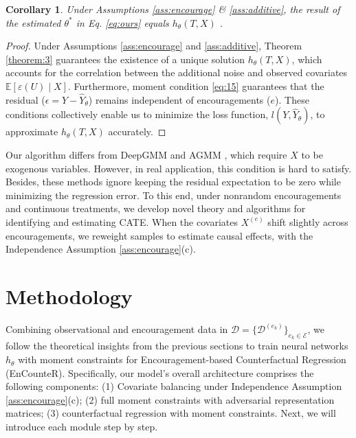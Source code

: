 \documentclass[journal]{IEEEtran}
\newtheorem{corollary}{Corollary}
\begin{document}
\begin{corollary} \label{corollary:1}
    Under Assumptions \ref{ass:encourage} \& \ref{ass:additive}, the result of the estimated $\theta^\ast$ in Eq. \eqref{eq:ours} equals ${ h  }_{\theta}(T,X)$ .
\end{corollary}

\begin{proof}
    Under Assumptions \ref{ass:encourage} and \ref{ass:additive}, Theorem \ref{theorem:3} guarantees the existence of a unique solution $h_{\theta}(T, X)$, which accounts for the correlation between the additional noise and observed covariates $\mathbb{E}[\varepsilon(U) \mid X]$. Furthermore, moment condition \eqref{eq:15} guarantees that the residual ($\epsilon = Y - \hat{Y}_\theta$) remains independent of encouragements ($e$). These conditions collectively enable us to minimize the loss function, $l(Y,\hat{Y}_{\theta})$, to approximate ${ h }_{\theta}(T,X)$ accurately.
\end{proof}

Our algorithm differs from DeepGMM \cite{2019deepgmm} and AGMM \cite{lewis2020agmm}, which require $X$ to be exogenous variables. However, in real application, this condition is hard to satisfy. Besides, these methods ignore keeping the residual expectation to be zero while minimizing the regression error. 
To this end, under nonrandom encouragements and continuous treatments, we develop novel theory and algorithms for identifying and estimating CATE. When the covariates $X^{(e)}$ shift slightly across encouragements, we reweight samples to estimate causal effects, with the Independence Assumption \ref{ass:encourage}(c).

\section{Methodology}
Combining observational and encouragement data in $\mathcal{D} = \{ \mathcal{D}^{(e_k)} \}_{e_k \in \mathcal{E}}$, we follow the theoretical insights from the previous sections to train neural networks $h_{\theta}$ with moment constraints for Encouragement-based Counterfactual Regression (EnCounteR). Specifically, our model's overall architecture comprises the following components: (1) Covariate balancing under Independence Assumption \ref{ass:encourage}(c); (2) full moment constraints with adversarial representation matrices; (3) counterfactual regression with moment constraints. Next, we will introduce each module step by step.
\end{document}
